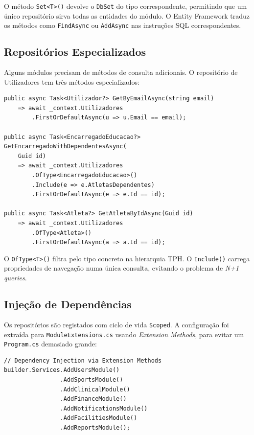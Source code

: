 O método \texttt{Set<T>()} devolve o \texttt{DbSet} do tipo correspondente, permitindo que um único repositório sirva todas as entidades do módulo. O Entity Framework traduz os métodos como \texttt{FindAsync} ou \texttt{AddAsync} nas instruções SQL correspondentes.

\subsection{Repositórios Especializados}

Alguns módulos precisam de métodos de consulta adicionais. O repositório de Utilizadores tem três métodos especializados:

\begin{lstlisting}[language={[Sharp]C},basicstyle=\ttfamily\small,breaklines=true,frame=single,caption={Métodos especializados do \texttt{UserRepository}.},label={lst:userrepo}]
public async Task<Utilizador?> GetByEmailAsync(string email)
    => await _context.Utilizadores
        .FirstOrDefaultAsync(u => u.Email == email);

public async Task<EncarregadoEducacao?> GetEncarregadoWithDependentesAsync(
    Guid id)
    => await _context.Utilizadores
        .OfType<EncarregadoEducacao>()
        .Include(e => e.AtletasDependentes)
        .FirstOrDefaultAsync(e => e.Id == id);

public async Task<Atleta?> GetAtletaByIdAsync(Guid id)
    => await _context.Utilizadores
        .OfType<Atleta>()
        .FirstOrDefaultAsync(a => a.Id == id);
\end{lstlisting}

O \texttt{OfType<T>()} filtra pelo tipo concreto na hierarquia TPH. O \texttt{Include()} carrega propriedades de navegação numa única consulta, evitando o problema de \textit{N+1 queries}.

\subsection{Injeção de Dependências}

Os repositórios são registados com ciclo de vida \texttt{Scoped}. A configuração foi extraída para \texttt{ModuleExtensions.cs} usando \textit{Extension Methods}, para evitar um \texttt{Program.cs} demasiado grande:

\begin{lstlisting}[language={[Sharp]C},basicstyle=\ttfamily\small,breaklines=true,frame=single,caption={Registo delegado aos métodos de extensão (\texttt{Program.cs}).},label={lst:di}]
// Dependency Injection via Extension Methods
builder.Services.AddUsersModule()
                .AddSportsModule()
                .AddClinicalModule()
                .AddFinanceModule()
                .AddNotificationsModule()
                .AddFacilitiesModule()
                .AddReportsModule();
\end{lstlisting}

